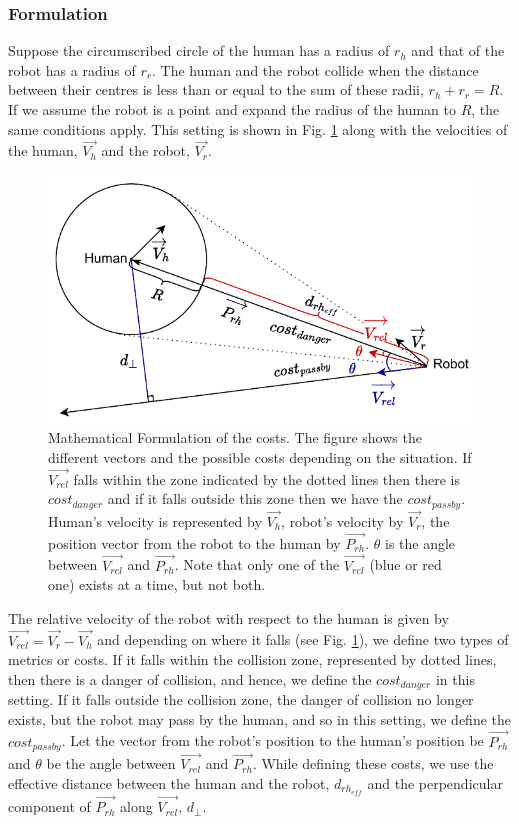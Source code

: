 \subsubsection{Formulation}
Suppose the circumscribed circle of the human has a radius of $r_h$ and that of the robot has a radius of $r_r$. The human and the robot collide when the distance between their centres is less than or equal to the sum of these radii, $r_h+r_r = R$. If we assume the robot is a point and expand the radius of the human to $R$, the same conditions apply. This setting is shown in Fig. \ref{fig:vel_vectors} along with the velocities of the human, $\overrightarrow{V_h}$ and the robot, $\overrightarrow{V_r}$. 
\begin{figure}[h!]
    \centering
    \includegraphics[width=0.9\columnwidth]{images/chapter6/fig_vector.pdf}
    \caption{Mathematical Formulation of the costs. The figure shows the different vectors and the possible costs depending on the situation. If $\overrightarrow {V_{rel}}$ falls within the zone indicated by the dotted lines then there is $cost_{danger}$ and if it falls outside this zone then we have the $cost_{passby}$. Human's velocity is represented by $\overrightarrow{V_h}$, robot's velocity by $\overrightarrow{V_r}$, the position vector from the robot to the human by $\overrightarrow{P_{rh}}$. $\theta$ is the angle between $\overrightarrow{V_{rel}}$ and $\overrightarrow{P_{rh}}$. Note that only one of the $\overrightarrow{V_{rel}}$ (blue or red one) exists at a time, but not both.}
    \label{fig:vel_vectors}
\end{figure}
The relative velocity of the robot with respect to the human is given by $\overrightarrow{V_{rel}}=\overrightarrow{V_r} - \overrightarrow{V_h}$ and depending on where it falls (see Fig. \ref{fig:vel_vectors}), we define two types of metrics or costs. If it falls within the collision zone, represented by dotted lines, then there is a danger of collision, and hence, we define the $cost_{danger}$ in this setting. If it falls outside the collision zone, the danger of collision no longer exists, but the robot may pass by the human, and so in this setting, we define the $cost_{passby}$. Let the vector from the robot's position to the human's position be $\overrightarrow{P_{rh}}$ and $\theta$ be the angle between $\overrightarrow{V_{rel}}$ and $\overrightarrow{P_{rh}}$. While defining these costs, we use the effective distance between the human and the robot, $d_{rh_{eff}}$ and the perpendicular component of $\overrightarrow{P_{rh}}$ along $\overrightarrow{V_{rel}}$, $d_{\perp}$. 



